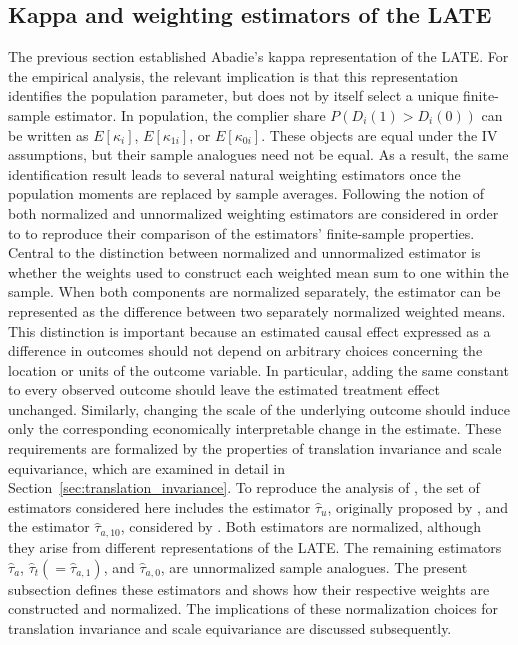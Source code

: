 \documentclass[12pt, a4paper, oneside]{article}
\theoremstyle{plain}
\theoremstyle{definition}
\begin{document}
\subsection{Kappa and weighting estimators of the LATE}
The previous section established Abadie's kappa representation of the LATE. For
the empirical analysis, the relevant implication is that this representation
identifies the population parameter, but does not by itself select a unique
finite-sample estimator. In population, the complier share
$P(D_i(1)>D_i(0))$ can be written as $E[\kappa_i]$, $E[\kappa_{1i}]$, or
$E[\kappa_{0i}]$. These objects are equal under the IV assumptions, but their
sample analogues need not be equal. As a result, the same identification result
leads to several natural weighting estimators once the population moments are
replaced by sample averages.
Following the notion of \citet{sloczynski2025abadie} both normalized and unnormalized weighting estimators are considered in order to to reproduce their comparison of the estimators' finite-sample properties.
Central to the distinction between normalized and unnormalized estimator is whether the weights used to construct each weighted mean sum to one within the sample. When both components are normalized separately, the estimator can be represented as the difference between two separately normalized weighted means.
This distinction is important because an estimated causal effect expressed as a difference in outcomes should not depend on arbitrary choices concerning the location or units of the outcome variable. In particular, adding the same constant to every observed outcome should leave the estimated treatment effect unchanged. Similarly, changing the scale of the underlying outcome should induce only the corresponding economically interpretable change in the estimate. These requirements are formalized by the properties of translation invariance
and scale equivariance, which are examined in detail in
Section~\ref{sec:translation_invariance}.
To reproduce the analysis of \citet{sloczynski2025abadie}, the set of estimators considered here includes the estimator $\hat\tau_u$, originally proposed by \citet{uysal2011three}, and the estimator $\hat\tau_{a,10}$, considered by \citet{abadie2018econometric}.
Both estimators are normalized, although they arise from different representations of the LATE.
The remaining estimators 
$\hat\tau_a$, $\hat\tau_t(=\hat\tau_{a,1})$, and $\hat\tau_{a,0}$, are
unnormalized sample analogues. 
The present subsection defines these estimators and shows how their respective weights are constructed and normalized. The implications of these normalization choices for translation invariance and scale equivariance are discussed subsequently.\\
\end{document}
